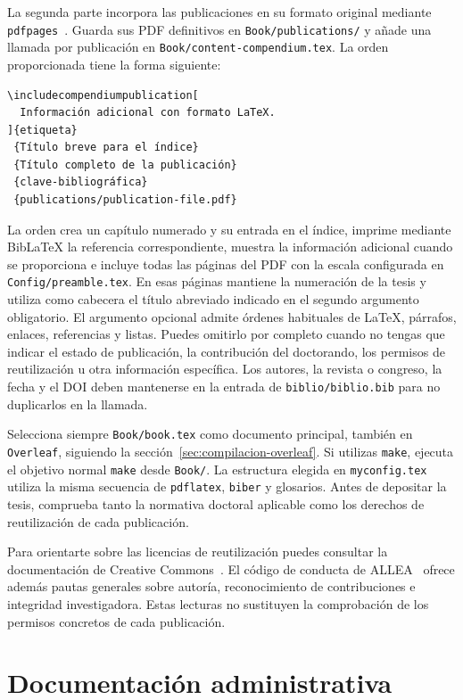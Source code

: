 La segunda parte incorpora las publicaciones en su formato original mediante \texttt{pdfpages}~\cite{pdfpages-manual}. Guarda sus PDF definitivos en \texttt{Book/publications/} y añade una llamada por publicación en \texttt{Book/content-compendium.tex}. La orden proporcionada tiene la forma siguiente:

\begin{verbatim}
\includecompendiumpublication[
  Información adicional con formato LaTeX.
]{etiqueta}
 {Título breve para el índice}
 {Título completo de la publicación}
 {clave-bibliográfica}
 {publications/publication-file.pdf}
\end{verbatim}

La orden crea un capítulo numerado y su entrada en el índice, imprime mediante BibLaTeX la referencia correspondiente, muestra la información adicional cuando se proporciona e incluye todas las páginas del PDF con la escala configurada en \texttt{Config/preamble.tex}. En esas páginas mantiene la numeración de la tesis y utiliza como cabecera el título abreviado indicado en el segundo argumento obligatorio. El argumento opcional admite órdenes habituales de \LaTeX{}, párrafos, enlaces, referencias y listas. Puedes omitirlo por completo cuando no tengas que indicar el estado de publicación, la contribución del doctorando, los permisos de reutilización u otra información específica. Los autores, la revista o congreso, la fecha y el DOI deben mantenerse en la entrada de \texttt{biblio/biblio.bib} para no duplicarlos en la llamada.

Selecciona siempre \texttt{Book/book.tex} como documento principal, también en \texttt{Overleaf}, siguiendo la sección~\ref{sec:compilacion-overleaf}. Si utilizas \texttt{make}, ejecuta el objetivo normal \texttt{make} desde \texttt{Book/}. La estructura elegida en \texttt{myconfig.tex} utiliza la misma secuencia de \texttt{pdflatex}, \texttt{biber} y glosarios. Antes de depositar la tesis, comprueba tanto la normativa doctoral aplicable como los derechos de reutilización de cada publicación.

Para orientarte sobre las licencias de reutilización puedes consultar la documentación de Creative Commons~\cite{creativecommons-licenses}. El código de conducta de ALLEA~\cite{allea2023integrity} ofrece además pautas generales sobre autoría, reconocimiento de contribuciones e integridad investigadora. Estas lecturas no sustituyen la comprobación de los permisos concretos de cada publicación.

\section{Documentación administrativa}
\label{sec:introapp1}

